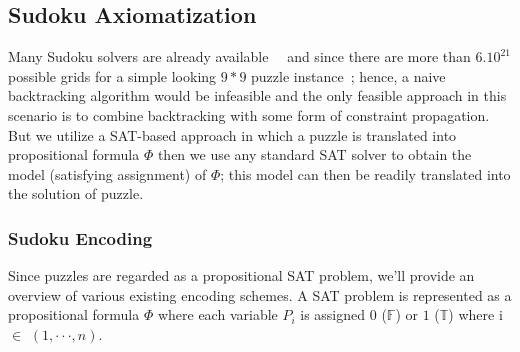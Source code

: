 \documentclass[letterpaper]{article}
\begin{document}
\subsection{Sudoku Axiomatization}
Many Sudoku solvers are already available~\citet{Pete2005}~\citet{DeadMan2005} and since there are more than $6.10^{21}$ possible grids for a simple looking $9\ast9$ puzzle instance~\citet{Bertram2005}; hence, a naive backtracking algorithm would be infeasible and the only feasible approach in this scenario is to combine backtracking with some form of constraint propagation. But we utilize a SAT-based approach in which a puzzle is translated into propositional formula $\Phi$ then we use any standard SAT solver to obtain the model (satisfying assignment) of $\Phi$; this model can then be readily translated into the solution of puzzle.

\subsubsection{Sudoku Encoding}
Since puzzles are regarded as a propositional SAT problem, we'll provide an overview of various existing encoding schemes. A SAT problem is represented as a propositional formula  $\Phi$ where each variable $P_i$ is assigned $0$ ($\mathbb{F}$) or $1$ ($\mathbb{T}$) where i $\in$ $(1,\cdot\cdot\cdot,n)$. %
\end{document}
